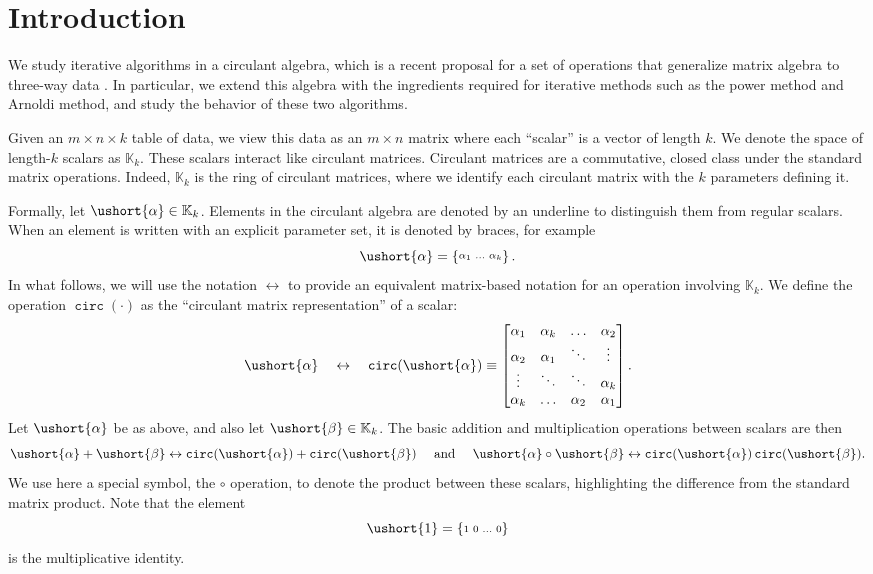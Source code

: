 \documentclass[1p,authoryear,letterpaper]{elsarticle}
\renewcommand{\cite}{\citep}
\DeclareMathOperator{\tcirc}{\texttt{circ}}
\providecommand{\eqdef}{\equiv}
\providecommand{\KK}{\mathbb{K}}
\providecommand{\bmat}[1]{\begin{bmatrix} #1 \end{bmatrix}}
\renewcommand{\circeq}{\leftrightarrow}
\newcommand{\cel}[1]{\ushort{#1}}
\newcommand{\csbmat}[1]{\left\{\! \begin{smallmatrix} #1
\end{smallmatrix} \! \right\}}
\newcommand{\calpha}{\ensuremath{\cel{\alpha}}}
\newcommand{\cbeta}{\ensuremath{\cel{\beta}}}
\begin{document}
\section{Introduction}



We study iterative algorithms in a circulant algebra, which is
a recent proposal for a set of operations that generalize matrix
algebra to three-way data \cite{kilmer2008-circ-tensor-svd}.
In particular, we extend this algebra
with the ingredients required for iterative methods such as the
power method and Arnoldi method, and study the behavior of
these two algorithms.



Given an $m \times n \times k$ table of data, we view this data
as an $m \times n$ matrix where each ``scalar'' is a vector of
length $k$.  We denote the space of length-$k$ scalars as $\KK_k$.
These scalars interact like circulant matrices.
Circulant matrices are a commutative, closed class under the standard matrix operations.
Indeed, $\KK_k$ is the ring of circulant matrices, where we
identify each circulant
matrix with the $k$ parameters defining it.

Formally, let $\calpha \in \KK_k$.
Elements in the circulant algebra are denoted by an underline to distinguish
them from regular scalars.  When an element is written with an explicit
parameter set, it is denoted by braces, for example $$\calpha =
\csbmat{ \alpha_1 & \ldots & \alpha_k }.$$ In what follows, we will use the notation $\circeq$ to provide an equivalent matrix-based notation for an operation involving $\KK_k$.
We define the operation $\tcirc(\cdot)$
as the ``circulant matrix representation'' of a scalar:
\begin{equation} \label{eq:circ-op-start}
 \calpha \quad \circeq \quad \tcirc(\calpha)  \eqdef
\bmat{ \alpha_1 & \alpha_{k} & \ldots & \alpha_2 \\
        \alpha_2 & \alpha_1 & \ddots & \vdots \\
        \vdots & \ddots & \ddots & \alpha_k \\
        \alpha_k & \ldots &\alpha_2 & \alpha_1} .
\end{equation}				
Let $\calpha$ be as above, and also let  $\cbeta \in \KK_k$.
The basic addition  and multiplication operations between scalars are then
\begin{equation}
 \calpha + \cbeta \circeq \tcirc(\calpha) + \tcirc(\cbeta)
\quad \text{ and } \quad \calpha \circ \cbeta \circeq \tcirc(\calpha) \tcirc(\cbeta).
\end{equation}
We use here a special symbol, the $\circ$ operation, to denote the product between these scalars, highlighting the difference from the standard matrix product.
Note that the element
\[ \cel{1} = \csbmat{ 1 & 0 & \ldots & 0 } \] is
the multiplicative identity.
\end{document}
